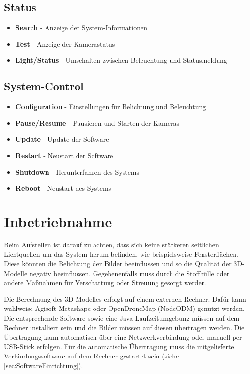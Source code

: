 \documentclass[./00PhotoBox.tex]{subfiles}
\begin{document}
\subsection{\foreignlanguage{british}{Status}}
\begin{itemize}
    \item \textbf{\foreignlanguage{british}{Search}} - Anzeige der System-Informationen
    \item \textbf{\foreignlanguage{british}{Test}} - Anzeige der Kamerastatus
    \item \textbf{\foreignlanguage{british}{Light/Status}} - Umschalten zwischen Beleuchtung und Statusmeldung
\end{itemize}

\subsection{\foreignlanguage{british}{System-Control}}
\begin{itemize}
    \item \textbf{\foreignlanguage{british}{Configuration}} - Einstellungen für Belichtung und Beleuchtung
    \item \textbf{\foreignlanguage{british}{Pause/Resume}} - Pausieren und Starten der Kameras
    \item \textbf{\foreignlanguage{british}{Update}} - Update der Software
    \item \textbf{\foreignlanguage{british}{Restart}} - Neustart der Software
    \item \textbf{\foreignlanguage{british}{Shutdown}} - Herunterfahren des Systems
    \item \textbf{\foreignlanguage{british}{Reboot}} - Neustart des Systems
\end{itemize}


\section{Inbetriebnahme}
Beim Aufstellen ist darauf zu achten, dass sich keine stärkeren seitlichen Lichtquellen um das System herum befinden, wie beispielsweise Fensterflächen. Diese könnten die Belichtung der Bilder beeinflussen und so die Qualität der 3D-Modelle negativ beeinflussen. Gegebenenfalls muss durch die Stoffhülle oder andere Maßnahmen für Verschattung oder Streuung gesorgt werden.

Die Berechnung des 3D-Modelles erfolgt auf einem externen Rechner. Dafür kann wahlweise Agisoft Metashape oder OpenDroneMap (NodeODM) genutzt werden. Die entsprechende Software sowie eine Java-Laufzeitumgebung müssen auf dem Rechner installiert sein und die Bilder müssen auf diesen übertragen werden. Die Übertragung kann automatisch über eine Netzwerkverbindung oder manuell per USB-Stick erfolgen. Für die automatische Übertragung muss die mitgelieferte Verbindungssoftware auf dem Rechner gestartet sein (siehe \autoref{sec:SoftwareEinrichtung}).
\end{document}

